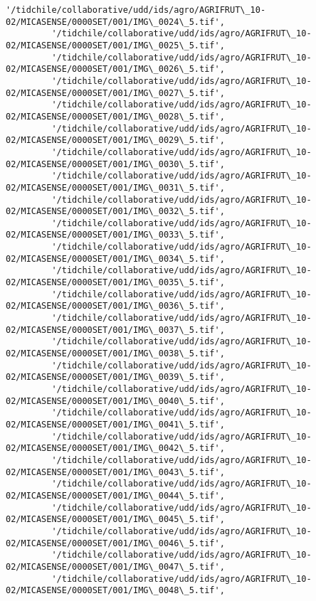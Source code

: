 \documentclass[11pt]{article}
\begin{document}
\begin{Verbatim}[commandchars=\\\{\}]
         '/tidchile/collaborative/udd/ids/agro/AGRIFRUT\_10-02/MICASENSE/0000SET/001/IMG\_0024\_5.tif',
         '/tidchile/collaborative/udd/ids/agro/AGRIFRUT\_10-02/MICASENSE/0000SET/001/IMG\_0025\_5.tif',
         '/tidchile/collaborative/udd/ids/agro/AGRIFRUT\_10-02/MICASENSE/0000SET/001/IMG\_0026\_5.tif',
         '/tidchile/collaborative/udd/ids/agro/AGRIFRUT\_10-02/MICASENSE/0000SET/001/IMG\_0027\_5.tif',
         '/tidchile/collaborative/udd/ids/agro/AGRIFRUT\_10-02/MICASENSE/0000SET/001/IMG\_0028\_5.tif',
         '/tidchile/collaborative/udd/ids/agro/AGRIFRUT\_10-02/MICASENSE/0000SET/001/IMG\_0029\_5.tif',
         '/tidchile/collaborative/udd/ids/agro/AGRIFRUT\_10-02/MICASENSE/0000SET/001/IMG\_0030\_5.tif',
         '/tidchile/collaborative/udd/ids/agro/AGRIFRUT\_10-02/MICASENSE/0000SET/001/IMG\_0031\_5.tif',
         '/tidchile/collaborative/udd/ids/agro/AGRIFRUT\_10-02/MICASENSE/0000SET/001/IMG\_0032\_5.tif',
         '/tidchile/collaborative/udd/ids/agro/AGRIFRUT\_10-02/MICASENSE/0000SET/001/IMG\_0033\_5.tif',
         '/tidchile/collaborative/udd/ids/agro/AGRIFRUT\_10-02/MICASENSE/0000SET/001/IMG\_0034\_5.tif',
         '/tidchile/collaborative/udd/ids/agro/AGRIFRUT\_10-02/MICASENSE/0000SET/001/IMG\_0035\_5.tif',
         '/tidchile/collaborative/udd/ids/agro/AGRIFRUT\_10-02/MICASENSE/0000SET/001/IMG\_0036\_5.tif',
         '/tidchile/collaborative/udd/ids/agro/AGRIFRUT\_10-02/MICASENSE/0000SET/001/IMG\_0037\_5.tif',
         '/tidchile/collaborative/udd/ids/agro/AGRIFRUT\_10-02/MICASENSE/0000SET/001/IMG\_0038\_5.tif',
         '/tidchile/collaborative/udd/ids/agro/AGRIFRUT\_10-02/MICASENSE/0000SET/001/IMG\_0039\_5.tif',
         '/tidchile/collaborative/udd/ids/agro/AGRIFRUT\_10-02/MICASENSE/0000SET/001/IMG\_0040\_5.tif',
         '/tidchile/collaborative/udd/ids/agro/AGRIFRUT\_10-02/MICASENSE/0000SET/001/IMG\_0041\_5.tif',
         '/tidchile/collaborative/udd/ids/agro/AGRIFRUT\_10-02/MICASENSE/0000SET/001/IMG\_0042\_5.tif',
         '/tidchile/collaborative/udd/ids/agro/AGRIFRUT\_10-02/MICASENSE/0000SET/001/IMG\_0043\_5.tif',
         '/tidchile/collaborative/udd/ids/agro/AGRIFRUT\_10-02/MICASENSE/0000SET/001/IMG\_0044\_5.tif',
         '/tidchile/collaborative/udd/ids/agro/AGRIFRUT\_10-02/MICASENSE/0000SET/001/IMG\_0045\_5.tif',
         '/tidchile/collaborative/udd/ids/agro/AGRIFRUT\_10-02/MICASENSE/0000SET/001/IMG\_0046\_5.tif',
         '/tidchile/collaborative/udd/ids/agro/AGRIFRUT\_10-02/MICASENSE/0000SET/001/IMG\_0047\_5.tif',
         '/tidchile/collaborative/udd/ids/agro/AGRIFRUT\_10-02/MICASENSE/0000SET/001/IMG\_0048\_5.tif',

\end{Verbatim}
\end{document}
